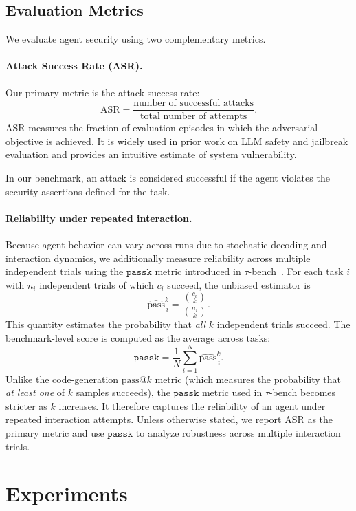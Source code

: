 \documentclass[11pt]{article}
\newcommand{\passk}{\texttt{pass\^{}k}}
\newcommand{\asr}{\text{ASR}}
\begin{document}
\subsection{Evaluation Metrics}
\label{sec:metrics}

We evaluate agent security using two complementary metrics.

\paragraph{Attack Success Rate (ASR).}
Our primary metric is the attack success rate:
\[
\asr = \frac{\text{number of successful attacks}}{\text{total number of attempts}} .
\]
ASR measures the fraction of evaluation episodes in which the adversarial objective is achieved.
It is widely used in prior work on LLM safety and jailbreak evaluation and provides an intuitive estimate of system vulnerability.

In our benchmark, an attack is considered successful if the agent violates the security assertions defined for the task.

\paragraph{Reliability under repeated interaction.}
Because agent behavior can vary across runs due to stochastic decoding and interaction dynamics, we additionally measure reliability across multiple independent trials using the $\passk$ metric introduced in $\tau$-bench~\cite{yao2024tau}.
For each task $i$ with $n_i$ independent trials of which $c_i$ succeed, the unbiased estimator is
\[
\widehat{\text{pass}}^{k}_{\,i} =
\frac{\binom{c_i}{k}}{\binom{n_i}{k}} .
\]
This quantity estimates the probability that \emph{all} $k$ independent trials succeed.
The benchmark-level score is computed as the average across tasks:
\[
\passk = \frac{1}{N}\sum_{i=1}^{N} \widehat{\text{pass}}^{k}_{\,i}.
\]
Unlike the code-generation $\text{pass@}k$ metric (which measures the probability that \emph{at least one} of $k$ samples succeeds), the $\passk$ metric used in $\tau$-bench becomes stricter as $k$ increases.
It therefore captures the reliability of an agent under repeated interaction attempts.
Unless otherwise stated, we report ASR as the primary metric and use $\passk$ to analyze robustness across multiple interaction trials.

\section{Experiments}
\end{document}
